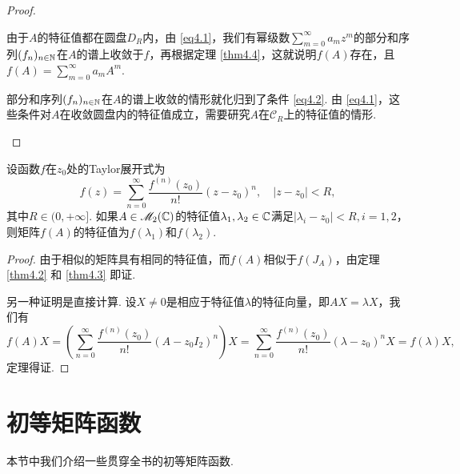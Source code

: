\begin{proof}
  \begin{enuma}
    \item 由于$A$的特征值都在圆盘$D_R$内，由 \eqref{eq4.1}，我们有幂级数$\sum_{m=0}^\infty a_mz^m$的部分和序列$(f_n)_{n\in\mathbb N}$在$A$的谱上收敛于$f$，再根据定理 \ref{thm4.4}，这就说明$f(A)$存在，且$f(A)=\sum_{m=0}^\infty a_mA^m$.

    \item 部分和序列$(f_n)_{n\in\mathbb N}$在$A$的谱上收敛的情形就化归到了条件 \eqref{eq4.2}. 由 \eqref{eq4.1}，这些条件对$A$在收敛圆盘内的特征值成立，需要研究$A$在$\mathscr C_R$上的特征值的情形.
  \end{enuma}
\end{proof}

\begin{mybox}
  \begin{theorem}
    设函数$f$在$z_0$处的Taylor展开式为
    \[
      f(z) = \sum_{n=0}^\infty \frac{f^{(n)}(z_0)}{n!}(z-z_0)^n,\quad |z-z_0|<R,
    \]
    其中$R\in(0,+\infty]$. 如果$A\in\mathscr M_2(\mathbb C)$的特征值$\lambda_1,\lambda_2\in\mathbb C$满足$|\lambda_i-z_0|<R,i=1,2$，则矩阵$f(A)$的特征值为$f(\lambda_1)$和$f(\lambda_2)$.  \end{theorem}
\end{mybox}

\begin{proof}
  由于相似的矩阵具有相同的特征值，而$f(A)$相似于$f(J_A)$，由定理 \ref{thm4.2} 和 \ref{thm4.3} 即证.

另一种证明是直接计算. 设$X\ne0$是相应于特征值$\lambda$的特征向量，即$AX=\lambda X$，我们有
\[
  f(A)X = \left( \sum_{n=0}^\infty \frac{f^{(n)}(z_0)}{n!}(A-z_0I_2)^n \right)X =
  \sum_{n=0}^\infty \frac{f^{(n)}(z_0)}{n!}(\lambda-z_0)^nX = f(\lambda)X,
\]
定理得证.
\end{proof}

\section{初等矩阵函数}
本节中我们介绍一些贯穿全书的初等矩阵函数.

